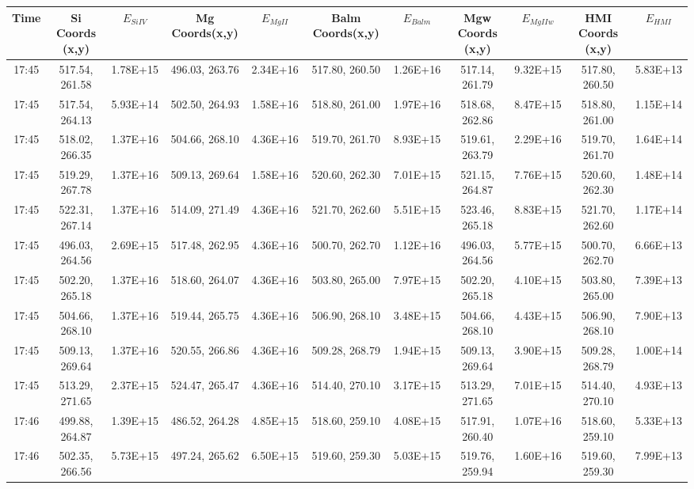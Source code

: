\begin{table}
\tiny
\centering
\begin{tabular}{|c|c|c|c|c|c|c|c|c|c|c|}
Time & Si Coords (x,y) & $E_{Si IV}$ & Mg Coords(x,y) & $E_{Mg II}$ & Balm Coords(x,y) & $E_{Balm}$ & Mgw Coords (x,y) & $E_{Mg II w}$ & HMI Coords (x,y) & $E_{HMI}$\\
\hline
17:45 & 517.54, 261.58 & 1.78E+15 & 496.03, 263.76 & 2.34E+16 & 517.80, 260.50 & 1.26E+16 & 517.14, 261.79 & 9.32E+15 & 517.80, 260.50 & 5.83E+13\\
17:45 & 517.54, 264.13 & 5.93E+14 & 502.50, 264.93 & 1.58E+16 & 518.80, 261.00 & 1.97E+16 & 518.68, 262.86 & 8.47E+15 & 518.80, 261.00 & 1.15E+14\\
17:45 & 518.02, 266.35 & 1.37E+16 & 504.66, 268.10 & 4.36E+16 & 519.70, 261.70 & 8.93E+15 & 519.61, 263.79 & 2.29E+16 & 519.70, 261.70 & 1.64E+14\\
17:45 & 519.29, 267.78 & 1.37E+16 & 509.13, 269.64 & 1.58E+16 & 520.60, 262.30 & 7.01E+15 & 521.15, 264.87 & 7.76E+15 & 520.60, 262.30 & 1.48E+14\\
17:45 & 522.31, 267.14 & 1.37E+16 & 514.09, 271.49 & 4.36E+16 & 521.70, 262.60 & 5.51E+15 & 523.46, 265.18 & 8.83E+15 & 521.70, 262.60 & 1.17E+14\\
17:45 & 496.03, 264.56 & 2.69E+15 & 517.48, 262.95 & 4.36E+16 & 500.70, 262.70 & 1.12E+16 & 496.03, 264.56 & 5.77E+15 & 500.70, 262.70 & 6.66E+13\\
17:45 & 502.20, 265.18 & 1.37E+16 & 518.60, 264.07 & 4.36E+16 & 503.80, 265.00 & 7.97E+15 & 502.20, 265.18 & 4.10E+15 & 503.80, 265.00 & 7.39E+13\\
17:45 & 504.66, 268.10 & 1.37E+16 & 519.44, 265.75 & 4.36E+16 & 506.90, 268.10 & 3.48E+15 & 504.66, 268.10 & 4.43E+15 & 506.90, 268.10 & 7.90E+13\\
17:45 & 509.13, 269.64 & 1.37E+16 & 520.55, 266.86 & 4.36E+16 & 509.28, 268.79 & 1.94E+15 & 509.13, 269.64 & 3.90E+15 & 509.28, 268.79 & 1.00E+14\\
17:45 & 513.29, 271.65 & 2.37E+15 & 524.47, 265.47 & 4.36E+16 & 514.40, 270.10 & 3.17E+15 & 513.29, 271.65 & 7.01E+15 & 514.40, 270.10 & 4.93E+13\\
17:46 & 499.88, 264.87 & 1.39E+15 & 486.52, 264.28 & 4.85E+15 & 518.60, 259.10 & 4.08E+15 & 517.91, 260.40 & 1.07E+16 & 518.60, 259.10 & 5.33E+13\\
17:46 & 502.35, 266.56 & 5.73E+15 & 497.24, 265.62 & 6.50E+15 & 519.60, 259.30 & 5.03E+15 & 519.76, 259.94 & 1.60E+16 & 519.60, 259.30 & 7.99E+13\\

\end{tabular}
\end{table}

